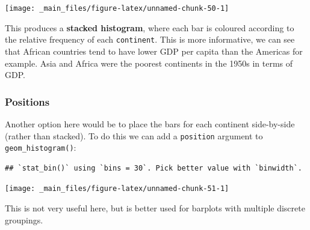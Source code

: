 \documentclass[]{book}
\newenvironment{Shaded}{\begin{snugshade}}{\end{snugshade}}
\newcommand{\KeywordTok}[1]{\textcolor[rgb]{0.13,0.29,0.53}{\textbf{{#1}}}}
\newcommand{\DataTypeTok}[1]{\textcolor[rgb]{0.13,0.29,0.53}{{#1}}}
\newcommand{\DecValTok}[1]{\textcolor[rgb]{0.00,0.00,0.81}{{#1}}}
\newcommand{\StringTok}[1]{\textcolor[rgb]{0.31,0.60,0.02}{{#1}}}
\newcommand{\NormalTok}[1]{{#1}}
\theoremstyle{definition}
\theoremstyle{definition}
\theoremstyle{definition}
\theoremstyle{remark}
\begin{document}
\begin{center}\texttt{[image: \_main\_files/figure-latex/unnamed-chunk-50-1]} \end{center}

This produces a \textbf{stacked histogram}, where each bar is coloured
according to the relative frequency of each \texttt{continent}. This is
more informative, we can see that African countries tend to have lower
GDP per capita than the Americas for example. Asia and Africa were the
poorest continents in the 1950s in terms of GDP.

\subsubsection{Positions}\label{positions}

Another option here would be to place the bars for each continent
side-by-side (rather than stacked). To do this we can add a
\texttt{position} argument to \texttt{geom\_histogram()}:

\begin{Shaded}
\end{Shaded}

\begin{verbatim}
## `stat_bin()` using `bins = 30`. Pick better value with `binwidth`.
\end{verbatim}

\begin{center}\texttt{[image: \_main\_files/figure-latex/unnamed-chunk-51-1]} \end{center}

This is not very useful here, but is better used for barplots with
multiple discrete groupings.
\end{document}
